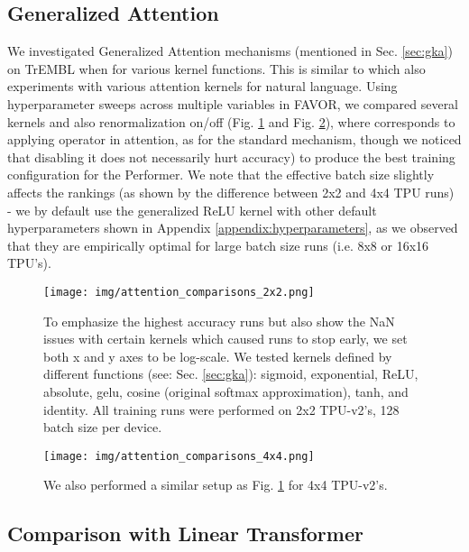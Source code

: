 \subsection{Generalized Attention}
\label{subsec:appendix_generalized_attention}
We investigated Generalized Attention mechanisms (mentioned in Sec. \ref{sec:gka}) on TrEMBL when  for various kernel functions. This is similar to \citep{tsai2019transformer} which also experiments with various attention kernels for natural language. Using hyperparameter sweeps across multiple variables in FAVOR, we compared several kernels and also renormalization on/off (Fig. \ref{fig:attention_comparisons_2x2} and Fig. \ref{fig:attention_comparisons_4x4}), where  corresponds to applying  operator in attention, as for the standard mechanism, though we noticed that disabling it does not necessarily hurt accuracy) to produce the best training configuration for the Performer. We note that the effective batch size slightly affects the rankings (as shown by the difference between 2x2 and 4x4 TPU runs) - we by default use the generalized ReLU kernel with other default hyperparameters shown in Appendix \ref{appendix:hyperparameters}, as we observed that they are empirically optimal for large batch size runs (i.e. 8x8 or 16x16 TPU's).

\begin{figure}[h]
  \centering
  \texttt{[image: img/attention\_comparisons\_2x2.png]}
  \caption{To emphasize the highest accuracy runs but also show the NaN issues with certain kernels which caused runs to stop early, we set both x and y axes to be log-scale. We tested kernels defined by different functions  (see: Sec. \ref{sec:gka}): sigmoid, exponential, ReLU, absolute, gelu, cosine (original softmax approximation), tanh, and identity. All training runs were performed on 2x2 TPU-v2's, 128 batch size per device.}
  \label{fig:attention_comparisons_2x2}
\end{figure}

\begin{figure}[h]
  \centering
  \texttt{[image: img/attention\_comparisons\_4x4.png]}
  \caption{We also performed a similar setup as Fig. \ref{fig:attention_comparisons_2x2} for 4x4 TPU-v2's.}
  \label{fig:attention_comparisons_4x4}
\end{figure}

\subsection{Comparison with Linear Transformer}
\label{appendix:linear_transformer}

